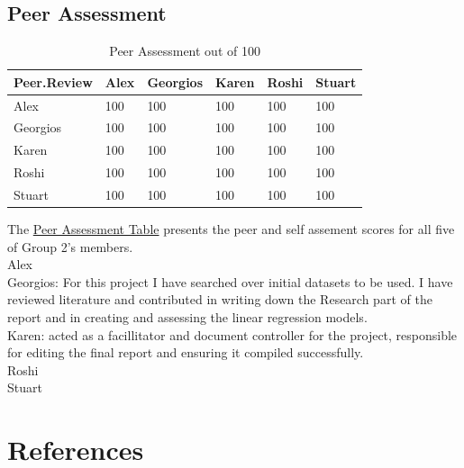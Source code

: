 \documentclass[10pt]{article}\usepackage[]{graphicx}\usepackage[]{color}
\begin{document}
\subsection{Peer Assessment}


\begin{table}[H]
\centering
\caption{Peer Assessment out of 100} 
\label{tab:two}
\begin{tabular}{llllll}
  \hline
Peer.Review & Alex & Georgios & Karen & Roshi & Stuart \\ 
  \hline
Alex & 100 & 100 & 100 & 100 & 100 \\ 
  Georgios & 100 & 100 & 100 & 100 & 100 \\ 
  Karen & 100 & 100 & 100 & 100 & 100 \\ 
  Roshi & 100 & 100 & 100 & 100 & 100 \\ 
  Stuart & 100 & 100 & 100 & 100 & 100 \\ 
   \hline
\end{tabular}
\end{table}


The \hyperref[tab:two]{Peer Assessment Table} presents the peer and self assement scores for all five of Group 2's members.\\

Alex\\

Georgios: For this project I have searched over initial datasets to be used. I have reviewed literature and contributed in writing down the Research part of the report and in creating and assessing the linear regression models.\\

Karen: acted as a facillitator and document controller for the project, responsible for editing the final report and ensuring it compiled successfully. \\

Roshi\\

Stuart\\



\pagebreak
\section*{References}\label{pubs}
\printbibliography[heading=none]
\end{document}
